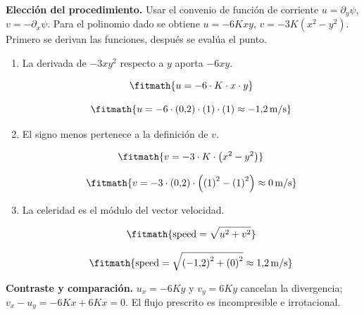 \noindent\textbf{Elección del procedimiento.} Usar el convenio de función de corriente $u=\partial_y\psi$, $v=-\partial_x\psi$. Para el polinomio dado se obtiene $u=-6Kxy$, $v=-3K(x^2-y^2)$. Primero se derivan las funciones, después se evalúa el punto.

\begin{enumerate}

\item La derivada de $-3xy^2$ respecto a $y$ aporta $-6xy$.

\[\fitmath{u=-6\cdot K\cdot x\cdot y}\]

\[\fitmath{u=-6\cdot (0{,}2)\cdot (1)\cdot (1)\approx -1{,}2\,\mathrm{m/s}}\]

\item El signo menos pertenece a la definición de $v$.

\[\fitmath{v=-3\cdot K\cdot \left({x}^{2}-{y}^{2}\right)}\]

\[\fitmath{v=-3\cdot (0{,}2)\cdot \left({(1)}^{2}-{(1)}^{2}\right)\approx 0\,\mathrm{m/s}}\]

\item La celeridad es el módulo del vector velocidad.

\[\fitmath{\mathrm{speed}=\sqrt{{u}^{2}+{v}^{2}}}\]

\[\fitmath{\mathrm{speed}=\sqrt{{(-1{,}2)}^{2}+{(0)}^{2}}\approx 1{,}2\,\mathrm{m/s}}\]

\end{enumerate}

\noindent\textbf{Contraste y comparación.} $u_x=-6Ky$ y $v_y=6Ky$ cancelan la divergencia; $v_x-u_y=-6Kx+6Kx=0$. El flujo prescrito es incompresible e irrotacional.
